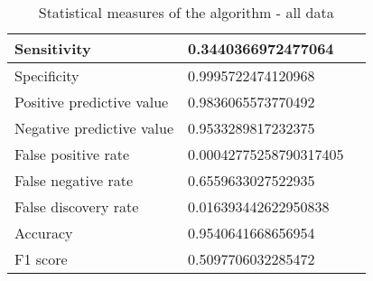 \begin{table}[H]
    \centering
    \begin{spacing}{1.5}
    \begin{tabular}{|l|l|l|}
        \hline
        Sensitivity                 & 0.3440366972477064 \\
        \hline
        Specificity                 & 0.9995722474120968 \\
        \hline
        Positive predictive value   & 0.9836065573770492 \\
        \hline
        Negative predictive value   & 0.9533289817232375 \\
        \hline
        False positive rate         & 0.00042775258790317405 \\
        \hline
        False negative rate         & 0.6559633027522935 \\
        \hline
        False discovery rate        & 0.016393442622950838 \\
        \hline
        Accuracy                    & 0.9540641668656954 \\
        \hline
        F1 score                    & 0.5097706032285472 \\
        \hline
    \end{tabular}
    \end{spacing}
    \caption{Statistical measures of the algorithm - all data}
\end{table}

